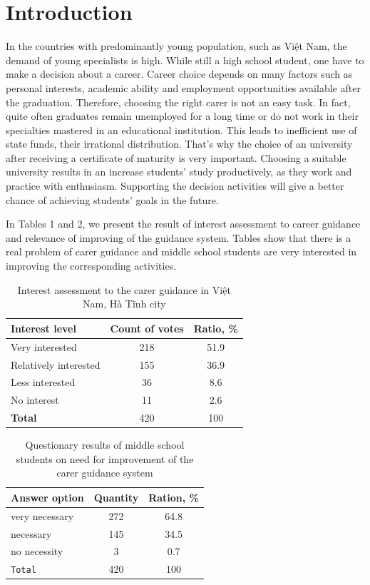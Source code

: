 \documentclass[conference,a4]{IEEEtran}
\begin{document}
\section{Introduction}

In the countries with predominantly young population, such as Việt Nam, the demand of young specialists is high.  While still a high school student, one have to make a decision about a career. Career choice depends on many factors such as personal interests, academic ability and employment opportunities available after the graduation.  Therefore, choosing the right carer is not an easy task.  In fact, quite often graduates remain unemployed for a long time or do not work in their specialties mastered in an educational institution.  This leads to inefficient use of state funds, their irrational distribution.  That's why the choice of an university after receiving a certificate of maturity is very important.  Choosing a suitable university results in an increase students' study productively, as they work and practice with enthusiasm.  Supporting the decision activities will give a better chance of achieving students' goals in the future.

In Tables 1 and 2, we present the result of interest assessment to career guidance and relevance of improving of the guidance system.  Tables show that there is a real problem of carer guidance and middle school students are very interested in improving the corresponding activities.
\begin{table}[thb]
  \caption{Interest assessment to the carer guidance in Việt Nam, Hà Tĩnh city}
  \label{tab:interest}
  \centering
  \begin{tabular}{|l|c|c|}
    \hline
    \textbf{Interest level} & \textbf{Count of votes} & \textbf{Ratio, \%} \\
    \hline
    Very interested & 218 & 51.9 \\
    \hline
    Relatively interested & 155 & 36.9 \\
    \hline
    Less interested & 36 & 8.6 \\
    \hline
    No interest & 11 & 2.6 \\
    \textbf{Total} & 420 & 100 \\
    \hline
  \end{tabular}
\end{table}

\begin{table}[bht]
  \caption{Questionary results of middle school students on need for improvement of the carer guidance system}
  \label{tab:interest}
  \centering
  \begin{tabular}{|l|c|c|}
    \hline
    \textbf{Answer option} & \textbf{Quantity} & \textbf{Ration, \%} \\
    \hline
    very necessary & 272 & 64.8 \\
    \hline
    necessary & 145 & 34.5 \\
    \hline
    no necessity & 3 & 0.7 \\
    \hline
    \texttt{Total} & 420 & 100 \\
    \hline
  \end{tabular}
\end{table}
\end{document}

